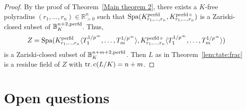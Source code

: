 \begin{proof}
By the proof of Theorem~\ref{Main theorem 2}, there exists a $K$-free polyradius $(r_1,\dots, r_n)\in \mathbb{R}_{>0}^{n}$ such that \(\operatorname{Spa}(K_{r_{1}, \ldots, r_{n}}^{\operatorname{perfd}}, K_{r_{1},
    \ldots, r_{n}}^{\operatorname{perfd}\circ})\) is a Zariski-closed subset of \(\mathbb{B}_{K}^{n+2,\operatorname{perfd}}\).
    Thus, \begin{equation*}Z = \operatorname{Spa}(K_{r_{1}, \ldots, r_{n}}^{\operatorname{perfd}}\langle T_{1}^{1 / p^{\infty}}, \ldots, T_{m}^{1 /
        p^{\infty}}\rangle, K_{r_{1},
    \ldots, r_{n}}^{\operatorname{perfd}\circ}\langle T_{1}^{1 / p^{\infty}}, \ldots, T_{m}^{1 / p^{\infty}}\rangle)\end{equation*}is a Zariski-closed subset of $\mathbb{B}_{K}^{n+m+2,\operatorname{perfd}}$. 
    Then \(L\) as in Theorem~\ref{lem:tate:frac} is a residue field of \(Z\) with
    \(\operatorname{tr.c}(L / K) = n+m\).
\end{proof}


\section{Open questions}
\label{sec:open:questions}

